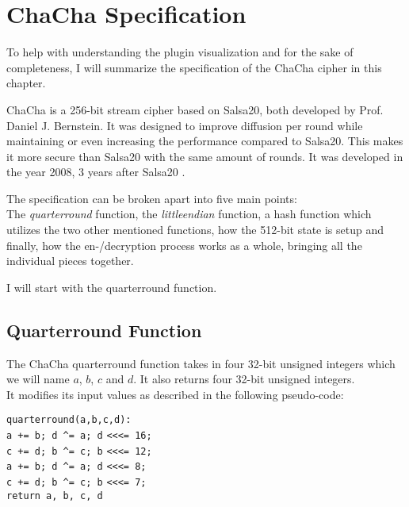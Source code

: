 \chapter{ChaCha Specification}
\label{chap:chacha}

To help with understanding the plugin visualization and for the sake of completeness, I will summarize the specification of the ChaCha cipher in this chapter.

ChaCha is a 256-bit stream cipher based on Salsa20, both developed by Prof. Daniel J. Bernstein. It was designed to improve diffusion per round while maintaining or even increasing the performance compared to Salsa20. This makes it more secure than Salsa20 with the same amount of rounds. It was developed in the year 2008, 3 years after Salsa20 \cite{chachaspec}.

The specification can be broken apart into five main points: \\
The \textit{quarterround} function, the \textit{littleendian} function, a hash function which utilizes the two other mentioned functions, how the 512-bit state is setup and finally, how the en-/decryption process works as a whole, bringing all the individual pieces together. 

I will start with the quarterround function.

\section{Quarterround Function}
\label{sec:chacha.qr}

The ChaCha quarterround function takes in four 32-bit unsigned integers which we will name $a$, $b$, $c$ and $d$. It also returns four 32-bit unsigned integers.\\
It modifies its input values as described in the following pseudo-code:

\begin{center}
\begin{minipage}{0.5\linewidth}
\texttt{quarterround(a,b,c,d):} \\
\hspace*{1em}\texttt{a += b; d  \^{}= a; d} \verb|<<<|\texttt{= 16;} \\
\hspace*{1em}\texttt{c += d; b \^{}= c; b} \verb|<<<|\texttt{= 12;} \\
\hspace*{1em}\texttt{a += b; d \^{}= a; d} \verb|<<<|\texttt{= 8;} \\
\hspace*{1em}\texttt{c += d; b \^{}= c; b} \verb|<<<|\texttt{= 7;} \\
\hspace*{1em}\texttt{return a, b, c, d}
\end{minipage}
\end{center}


